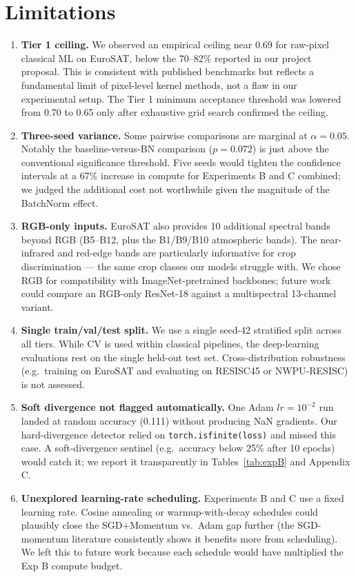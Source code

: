 \documentclass[10pt,letterpaper]{article}
\begin{document}
\section{Limitations}
\label{sec:limitations}
\begin{enumerate}[leftmargin=2em]
    \item \textbf{Tier 1 ceiling.} We observed an empirical ceiling near 0.69 for raw-pixel classical ML on EuroSAT, below the 70--82\% reported in our project proposal. This is consistent with published benchmarks but reflects a fundamental limit of pixel-level kernel methods, not a flaw in our experimental setup. The Tier 1 minimum acceptance threshold was lowered from 0.70 to 0.65 only after exhaustive grid search confirmed the ceiling.
    \item \textbf{Three-seed variance.} Some pairwise comparisons are marginal at $\alpha = 0.05$. Notably the baseline-versus-BN comparison ($p = 0.072$) is just above the conventional significance threshold. Five seeds would tighten the confidence intervals at a 67\% increase in compute for Experiments B and C combined; we judged the additional cost not worthwhile given the magnitude of the BatchNorm effect.
    \item \textbf{RGB-only inputs.} EuroSAT also provides 10 additional spectral bands beyond RGB (B5--B12, plus the B1/B9/B10 atmospheric bands). The near-infrared and red-edge bands are particularly informative for crop discrimination --- the same crop classes our models struggle with. We chose RGB for compatibility with ImageNet-pretrained backbones; future work could compare an RGB-only ResNet-18 against a multispectral 13-channel variant.
    \item \textbf{Single train/val/test split.} We use a single seed-42 stratified split across all tiers. While CV is used within classical pipelines, the deep-learning evaluations rest on the single held-out test set. Cross-distribution robustness (e.g.\ training on EuroSAT and evaluating on RESISC45 \cite{cheng2017} or NWPU-RESISC) is not assessed.
    \item \textbf{Soft divergence not flagged automatically.} One Adam $lr{=}10^{-2}$ run landed at random accuracy (0.111) without producing NaN gradients. Our hard-divergence detector relied on \texttt{torch.isfinite(loss)} and missed this case. A soft-divergence sentinel (e.g.\ accuracy below 25\% after 10 epochs) would catch it; we report it transparently in Tables~\ref{tab:expB} and Appendix C.
    \item \textbf{Unexplored learning-rate scheduling.} Experiments B and C use a fixed learning rate. Cosine annealing or warmup-with-decay schedules could plausibly close the SGD+Momentum vs.\ Adam gap further (the SGD-momentum literature consistently shows it benefits more from scheduling). We left this to future work because each schedule would have multiplied the Exp B compute budget.

\end{enumerate}
\end{document}
